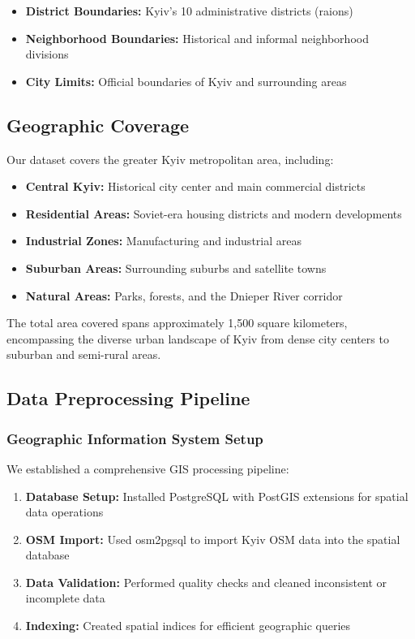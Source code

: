 \begin{itemize}
    \item \textbf{District Boundaries:} Kyiv's 10 administrative districts (raions)
    \item \textbf{Neighborhood Boundaries:} Historical and informal neighborhood divisions
    \item \textbf{City Limits:} Official boundaries of Kyiv and surrounding areas
\end{itemize}

\subsection{Geographic Coverage}

Our dataset covers the greater Kyiv metropolitan area, including:

\begin{itemize}
    \item \textbf{Central Kyiv:} Historical city center and main commercial districts
    \item \textbf{Residential Areas:} Soviet-era housing districts and modern developments
    \item \textbf{Industrial Zones:} Manufacturing and industrial areas
    \item \textbf{Suburban Areas:} Surrounding suburbs and satellite towns
    \item \textbf{Natural Areas:} Parks, forests, and the Dnieper River corridor
\end{itemize}

The total area covered spans approximately 1,500 square kilometers, encompassing the diverse urban landscape of Kyiv from dense city centers to suburban and semi-rural areas.

\subsection{Data Preprocessing Pipeline}

\subsubsection{Geographic Information System Setup}

We established a comprehensive GIS processing pipeline:

\begin{enumerate}
    \item \textbf{Database Setup:} Installed PostgreSQL with PostGIS extensions for spatial data operations
    \item \textbf{OSM Import:} Used osm2pgsql to import Kyiv OSM data into the spatial database
    \item \textbf{Data Validation:} Performed quality checks and cleaned inconsistent or incomplete data
    \item \textbf{Indexing:} Created spatial indices for efficient geographic queries
\end{enumerate}


